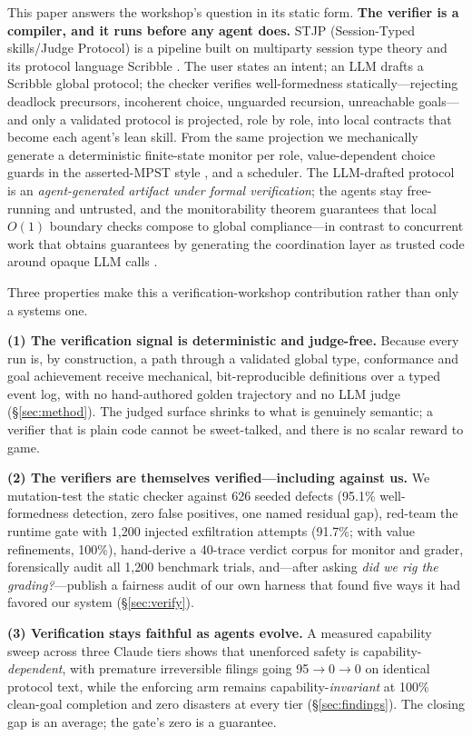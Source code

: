 \documentclass{article}
\newcommand{\stjp}{\textsc{STJP}}
\begin{document}
This paper answers the workshop's question in its static form. \textbf{The verifier is a compiler, and it runs before any agent does.} \stjp{} (Session-Typed skills/Judge Protocol) is a pipeline built on multiparty session type theory \citep{hyc08,scalas19} and its protocol language Scribble \citep{scribble}. The user states an intent; an LLM drafts a Scribble global protocol; the checker verifies well-formedness statically---rejecting deadlock precursors, incoherent choice, unguarded recursion, unreachable goals---and only a validated protocol is projected, role by role, into local contracts that become each agent's lean skill. From the same projection we mechanically generate a deterministic finite-state monitor per role, value-dependent choice guards in the asserted-MPST style \citep{bocchi10}, and a scheduler. The LLM-drafted protocol is an \emph{agent-generated artifact under formal verification}; the agents stay free-running and untrusted, and the monitorability theorem \citep{bocchi13} guarantees that local $O(1)$ boundary checks compose to global compliance---in contrast to concurrent work that obtains guarantees by generating the coordination layer as trusted code around opaque LLM calls \citep{bollig26}.

Three properties make this a verification-workshop contribution rather than only a systems one.

\textbf{(1) The verification signal is deterministic and judge-free.} Because every run is, by construction, a path through a validated global type, conformance and goal achievement receive mechanical, bit-reproducible definitions over a typed event log, with no hand-authored golden trajectory and no LLM judge (\S\ref{sec:method}). The judged surface shrinks to what is genuinely semantic; a verifier that is plain code cannot be sweet-talked, and there is no scalar reward to game.

\textbf{(2) The verifiers are themselves verified---including against us.} We mutation-test the static checker against 626 seeded defects (95.1\% well-formedness detection, zero false positives, one named residual gap), red-team the runtime gate with 1{,}200 injected exfiltration attempts (91.7\%; with value refinements, 100\%), hand-derive a 40-trace verdict corpus for monitor and grader, forensically audit all 1{,}200 benchmark trials, and---after asking \emph{did we rig the grading?}---publish a fairness audit of our own harness that found five ways it had favored our system (\S\ref{sec:verify}).

\textbf{(3) Verification stays faithful as agents evolve.} A measured capability sweep across three Claude tiers shows that unenforced safety is capability-\emph{dependent}, with premature irreversible filings going 95$\to$0$\to$0 on identical protocol text, while the enforcing arm remains capability-\emph{invariant} at 100\% clean-goal completion and zero disasters at every tier (\S\ref{sec:findings}). The closing gap is an average; the gate's zero is a guarantee.
\end{document}
